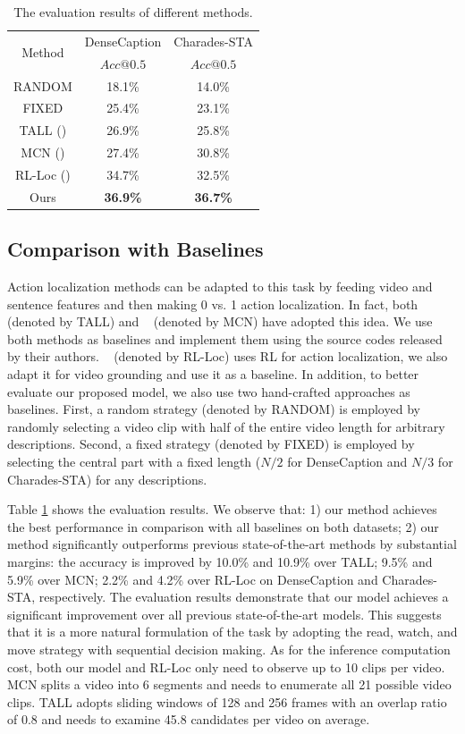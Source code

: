 \documentclass[letterpaper]{article} %
\begin{document}
\begin{table}[t!]
\centering
\begin{tabular}{ c |c |c}
  \hline		
  \multirow{2}{*}{Method} & DenseCaption & Charades-STA \\
  \cline{2-3}
  & $Acc@0.5$ & $Acc@0.5$ \\
  \hline
  \hline
  RANDOM &18.1\% &14.0\%  \\
  FIXED &25.4\% &23.1\% \\
  TALL (\citeauthor{tall}) &26.9\% &25.8\% \\
  MCN (\citeauthor{mcn}) &27.4\% &30.8\% \\
  RL-Loc (\citeauthor{lifeifei_loc}) &34.7\% & 32.5\% \\
  \hline
  Ours  &\textbf{36.9\%} &\textbf{36.7\%} \\
  \hline
\end{tabular}
\caption{The evaluation results of different methods.}
\label{t:compare}
\end{table}

\subsection{Comparison with Baselines}
Action localization methods can be adapted to this task by feeding video and sentence features and then making 0 vs. 1 action localization. In fact, both \citeauthor{tall}~ (denoted by TALL) and \citeauthor{mcn}~ (denoted by MCN) have adopted this idea.
We use both methods as baselines and implement them using the source codes released by their authors.
\citeauthor{lifeifei_loc}~ (denoted by RL-Loc) uses RL for action localization, we also adapt it for video grounding and use it as a baseline. In addition, to better evaluate our proposed model, we also use two hand-crafted approaches as baselines. First, a random strategy (denoted by RANDOM) is employed by randomly selecting a video clip with half of the entire video length for arbitrary descriptions. Second, a fixed strategy (denoted by FIXED) is employed by selecting the central part with a fixed length ($N/2$ for DenseCaption and $N/3$ for Charades-STA) for any descriptions.

Table \ref{t:compare} shows the evaluation results. We observe that: 1) our method achieves the best performance in comparison with all baselines on both datasets; 2) our method significantly outperforms previous state-of-the-art methods by substantial margins: the accuracy is improved by 10.0\% and 10.9\% over TALL; 9.5\% and 5.9\% over MCN; 2.2\% and 4.2\% over RL-Loc on DenseCaption and Charades-STA, respectively.
The evaluation results demonstrate that our model achieves a significant improvement over all previous state-of-the-art models.
This suggests that it is a more natural formulation of the task by adopting the read, watch, and move strategy with sequential decision making.
As for the inference computation cost, both our model and RL-Loc only need to observe up to 10 clips per video. MCN splits a video into 6 segments and needs to enumerate all 21 possible video clips. TALL adopts sliding windows of 128 and 256 frames with an overlap ratio of 0.8 and needs to examine 45.8 candidates per video on average.
\end{document}

